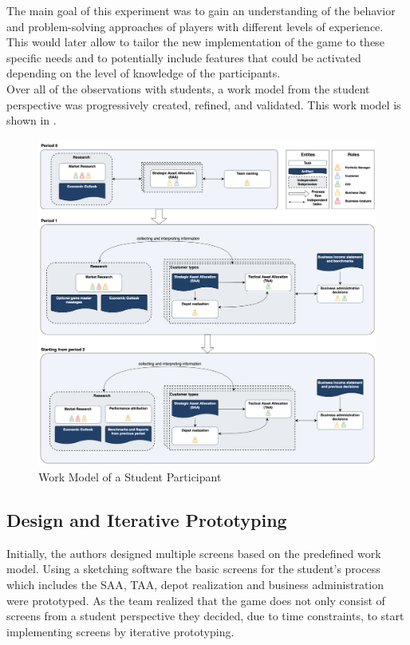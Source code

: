 The main goal of this experiment was to gain an understanding of the behavior and problem-solving approaches of players with different levels of experience. This would later allow to tailor the new implementation of the game to these specific needs and to potentially include features that could be activated depending on the level of knowledge of the participants. \\

Over all of the observations with students, a work model from the student perspective was progressively created, refined, and validated. This work model is shown in .

\begin{figure}[h!]
  \centering
  \includegraphics[scale=0.25]{img/work_model_pfm_game.png}
  \caption{Work Model of a Student Participant}
  \label{fig:work_model_student}
\end{figure}




\subsection{Design and Iterative Prototyping}
Initially, the authors designed multiple screens based on the predefined work model. Using a sketching software the basic screens for the student's process which includes the SAA, TAA, depot realization and business administration were prototyped. As the team realized that the game does not only consist of screens from a student perspective they decided, due to time constraints, to start implementing screens by iterative prototyping. \\

